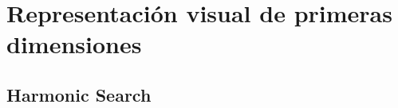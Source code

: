 
\appendix

\section{Representación visual de primeras dimensiones}

\subsection{Harmonic Search}

\vspace*{\fill}

